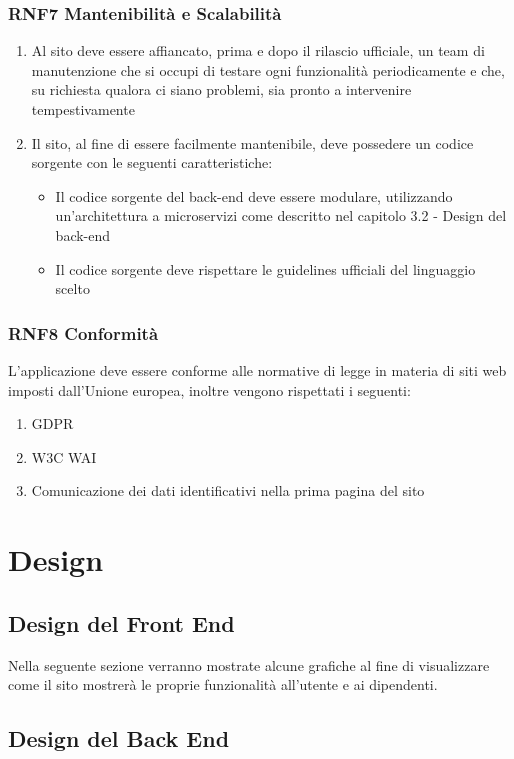 \documentclass{report}
\begin{document}
\subsection*{RNF7 Mantenibilità e Scalabilità}
\begin{enumerate}
	\item Al sito deve essere affiancato, prima e dopo il rilascio ufficiale, un team di manutenzione che si occupi di testare ogni funzionalità periodicamente e che, su richiesta qualora ci siano problemi, sia pronto a intervenire tempestivamente
	\item Il sito, al fine di essere facilmente mantenibile, deve possedere un codice sorgente con le seguenti caratteristiche:
	\begin{itemize}
		\item Il codice sorgente del back-end deve essere modulare, utilizzando un'architettura a microservizi come descritto nel capitolo 3.2 - Design del back-end
		\item Il codice sorgente deve rispettare le guidelines ufficiali del linguaggio scelto
	
	\end{itemize} 
\end{enumerate}
\subsection*{RNF8 Conformità}
L'applicazione deve essere conforme alle normative di legge in materia di siti web imposti dall'Unione europea, inoltre vengono rispettati i seguenti:
\begin{enumerate}
	\item GDPR
	\item W3C WAI
	\item Comunicazione dei dati identificativi nella prima pagina del sito
\end{enumerate}
\chapter{Design}

\section{Design del Front End}

Nella seguente sezione verranno mostrate alcune grafiche al fine di visualizzare come il sito mostrerà le proprie funzionalità all’utente e ai dipendenti.


\section{Design del Back End}
\end{document}

